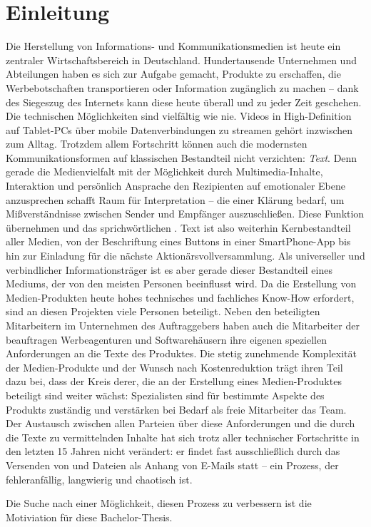 \section{Einleitung}

Die Herstellung von Informations- und Kommunikationsmedien ist heute ein zentraler Wirtschaftsbereich in Deutschland. Hundertausende Unternehmen und Abteilungen haben es sich zur Aufgabe gemacht, Produkte zu erschaffen, die Werbebotschaften transportieren oder Information zugänglich zu machen -- dank des Siegeszug des Internets kann diese heute überall und zu jeder Zeit geschehen. Die technischen Möglichkeiten sind vielfältig wie nie. Videos in High-Definition auf Tablet-PCs über mobile Datenverbindungen zu streamen gehört inzwischen zum Alltag. Trotzdem allem Fortschritt können auch die modernsten Kommunikationsformen auf klassischen Bestandteil nicht verzichten: \emph{Text}. Denn gerade die Medienvielfalt mit der Möglichkeit durch Multimedia-Inhalte, Interaktion und persönlich Ansprache den Rezipienten auf emotionaler Ebene anzusprechen schafft Raum für Interpretation -- die einer Klärung bedarf, um Mißverständnisse zwischen Sender und Empfänger auszuschließen. Diese Funktion übernehmen  und das sprichwörtlichen . Text ist also weiterhin Kernbestandteil aller Medien, von der Beschriftung eines Buttons in einer SmartPhone-App bis hin zur Einladung für die nächste Aktionärsvollversammlung. Als universeller und verbindlicher Informationsträger ist es aber gerade dieser Bestandteil eines Mediums, der von den meisten Personen beeinflusst wird. Da die Erstellung von Medien-Produkten heute hohes technisches und fachliches Know-How erfordert, sind an diesen Projekten viele Personen beteiligt. Neben den beteiligten Mitarbeitern im Unternehmen des Auftraggebers haben auch die Mitarbeiter der beauftragen Werbeagenturen und Softwarehäusern ihre eigenen speziellen Anforderungen an die Texte des Produktes. Die stetig zunehmende Komplexität der Medien-Produkte und der Wunsch nach Kostenreduktion trägt ihren Teil dazu bei, dass der Kreis derer, die an der Erstellung eines Medien-Produktes beteiligt sind weiter wächst: Spezialisten sind für bestimmte Aspekte des Produkts zuständig und verstärken bei Bedarf als freie Mitarbeiter das Team. Der Austausch zwischen allen Parteien über diese Anforderungen und die durch die Texte zu vermittelnden Inhalte hat sich trotz aller technischer Fortschritte in den letzten 15 Jahren nicht verändert: er findet fast ausschließlich durch das Versenden von  und Dateien als Anhang von E-Mails statt -- ein Prozess, der fehleranfällig, langwierig und chaotisch ist. 

\bigskip

Die Suche nach einer Möglichkeit, diesen Prozess zu verbessern ist die Motiviation für diese Bachelor-Thesis. 

\pagebreak